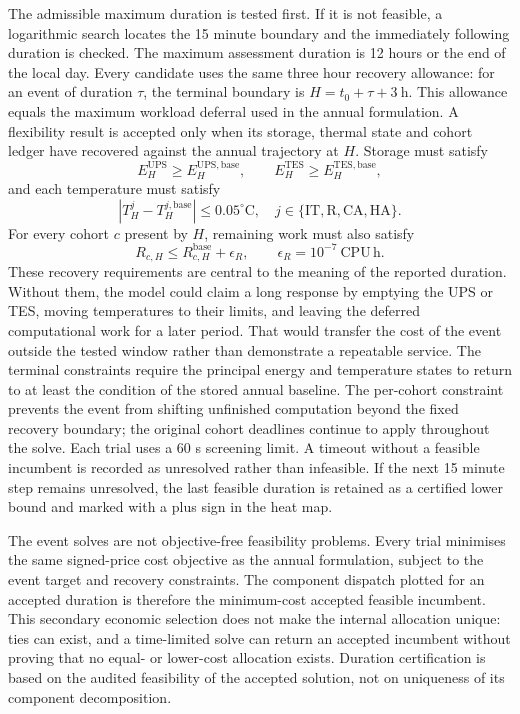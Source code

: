 The admissible maximum duration is tested first. If it is not feasible, a
logarithmic search locates the 15 minute boundary and the immediately following
duration is checked. The maximum assessment duration is 12 hours or the end of
the local day. Every candidate uses the same three hour recovery allowance: for
an event of duration $\tau$, the terminal boundary is
$H=t_0+\tau+3\ \mathrm{h}$. This allowance equals the maximum workload deferral
used in the annual formulation. A flexibility result is accepted only when its
storage, thermal state and cohort ledger have recovered against the annual
trajectory at $H$. Storage must satisfy
\begin{equation}
 E_H^{\mathrm{UPS}}\geq E_H^{\mathrm{UPS,base}},\qquad
 E_H^{\mathrm{TES}}\geq E_H^{\mathrm{TES,base}},
 \label{eq:flex-energy-recovery}
\end{equation}
and each temperature must satisfy
\begin{equation}
 \left|T_H^j-T_H^{j,\mathrm{base}}\right|\leq0.05^{\circ}\mathrm{C},
 \quad j\in\{\mathrm{IT,R,CA,HA}\}.
 \label{eq:flex-temperature-recovery}
\end{equation}
For every cohort $c$ present by $H$, remaining work must also satisfy
\begin{equation}
 R_{c,H}\leq R_{c,H}^{\mathrm{base}}+\epsilon_R,\qquad
 \epsilon_R=10^{-7}\ \mathrm{CPU\,h}.
 \label{eq:flex-workload-recovery}
\end{equation}
These recovery requirements are central to the meaning of the reported duration.
Without them, the model could claim a long response by emptying the UPS or TES,
moving temperatures to their limits, and leaving the deferred computational work
for a later period. That would transfer the cost of the event outside the tested
window rather than demonstrate a repeatable service. The terminal constraints
require the principal energy and temperature states to return to at least the
condition of the stored annual baseline. The per-cohort constraint prevents the
event from shifting unfinished computation beyond the fixed recovery boundary;
the original cohort deadlines continue to apply throughout the solve.
Each trial uses a 60 s screening limit. A timeout without a feasible incumbent
is recorded as unresolved rather than infeasible. If the next 15 minute step
remains unresolved, the last feasible duration is retained as a certified lower
bound and marked with a plus sign in the heat map.

The event solves are not objective-free feasibility problems. Every trial
minimises the same signed-price cost objective as the annual formulation, subject
to the event target and recovery constraints. The component dispatch plotted for
an accepted duration is therefore the minimum-cost accepted feasible incumbent.
This secondary economic selection does not make the internal allocation unique:
ties can exist, and a time-limited solve can return an accepted incumbent without
proving that no equal- or lower-cost allocation exists. Duration certification is
based on the audited feasibility of the accepted solution, not on uniqueness of
its component decomposition.

